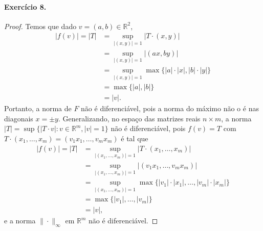 \documentclass[12pt,a4paper]{article}
\newcommand{\R}{\mathbb{R}}
\begin{document}
\paragraph{Exercício 8.}
    \begin{proof}
        Temos que dado $v = (a,b)\in\R^2$,
        \begin{align*}
            |f(v)| = |T| &= \sup_{|(x,y)| = 1} |T\cdot (x,y)| \\
                         &= \sup_{|(x,y)| = 1} |(ax, by)| \\
                         &= \sup_{|(x,y)| = 1} \max\{ |a|\cdot|x|, |b|\cdot |y| \} \\
                         &= \max\{ |a|, |b| \} \\
                         &= |v|.
        \end{align*}
        Portanto, a norma de $F$ não é diferenciável, pois a norma do máximo não o é nas 
        diagonais $x = \pm y$. Generalizando, no espaço das matrizes reais $n\times m$, 
        a norma $|T| = \sup\{ |T\cdot v| : v\in\R^m, |v| = 1 \}$ não é diferenciável,
        pois $f(v) = T$ com $T\cdot (x_1, \dots, x_m) = (v_1x_1, \dots, v_mx_m)$ é tal
        que
        \begin{align*}
            |f(v)| = |T| &= \sup_{|(x_1, \dots, x_m)| = 1} |T\cdot (x_1, \dots, x_m)| \\
                         &= \sup_{|(x_1, \dots, x_m)| = 1} |(v_1x_1, \dots, v_mx_m)| \\
                         &= \sup_{|(x_1, \dots, x_m)| = 1} \max\{ |v_1|\cdot|x_1|, \dots, 
                         |v_m|\cdot|x_m| \} \\
                         &= \max\{ |v_1|, \dots, |v_m| \} \\
                         &= |v|,
        \end{align*}
        e a norma $\|\cdot\|_{\infty}$ em $\R^m$ não é diferenciável.
    \end{proof}
\end{document}
